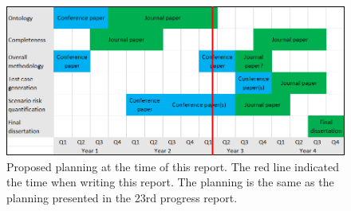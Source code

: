 \documentclass[10pt,final,a4paper,oneside,onecolumn]{article}
\begin{document}
\begin{figure}[t]
	\centering
	\includegraphics[width=\linewidth]{planning.png}
	\caption{Proposed planning at the time of this report. The red line indicated the time when writing this report. The planning is the same as the planning presented in the 23rd progress report.}
	\label{fig:planning}
\end{figure}




\clearpage

\end{document}
